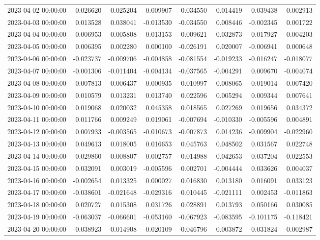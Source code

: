 \begin{tabular}{lrrrrrrr}
2023-04-02 00:00:00 & -0.026620 & -0.025204 & -0.009907 & -0.034550 & -0.014419 & -0.039438 & 0.002913 \\
2023-04-03 00:00:00 & 0.013528 & 0.038041 & -0.013530 & -0.034550 & 0.008446 & -0.002345 & 0.001722 \\
2023-04-04 00:00:00 & 0.006953 & -0.005808 & 0.013153 & -0.009621 & 0.032873 & 0.017927 & -0.004203 \\
2023-04-05 00:00:00 & 0.006395 & 0.002280 & 0.000100 & -0.026191 & 0.020007 & -0.006941 & 0.000648 \\
2023-04-06 00:00:00 & -0.023737 & -0.009706 & -0.004858 & -0.081554 & -0.019233 & -0.016247 & -0.018077 \\
2023-04-07 00:00:00 & -0.001306 & -0.011404 & -0.004134 & -0.037565 & -0.004291 & 0.009670 & -0.004074 \\
2023-04-08 00:00:00 & 0.007813 & -0.006437 & 0.000935 & -0.010997 & -0.008065 & -0.019014 & -0.007420 \\
2023-04-09 00:00:00 & 0.010579 & 0.013231 & 0.013740 & 0.022596 & 0.005294 & 0.009344 & 0.007641 \\
2023-04-10 00:00:00 & 0.019068 & 0.020032 & 0.045358 & 0.018565 & 0.027269 & 0.019656 & 0.034372 \\
2023-04-11 00:00:00 & 0.011766 & 0.009249 & 0.019061 & -0.007694 & -0.010330 & -0.005596 & 0.004891 \\
2023-04-12 00:00:00 & 0.007933 & -0.003565 & -0.010673 & -0.007873 & 0.014236 & -0.009904 & -0.022960 \\
2023-04-13 00:00:00 & 0.049613 & 0.018005 & 0.016653 & 0.045763 & 0.048502 & 0.031567 & 0.022748 \\
2023-04-14 00:00:00 & 0.029860 & 0.008807 & 0.002757 & 0.014988 & 0.042653 & 0.037204 & 0.022553 \\
2023-04-15 00:00:00 & 0.032091 & 0.003019 & -0.005596 & 0.002701 & -0.004444 & 0.033626 & 0.004037 \\
2023-04-16 00:00:00 & -0.002654 & 0.013325 & 0.000027 & 0.016830 & 0.013180 & 0.016091 & 0.033123 \\
2023-04-17 00:00:00 & -0.038601 & -0.021648 & -0.029316 & 0.010445 & -0.021111 & 0.002453 & -0.011863 \\
2023-04-18 00:00:00 & 0.020727 & 0.015308 & 0.031726 & 0.028891 & 0.013793 & 0.050166 & 0.030085 \\
2023-04-19 00:00:00 & -0.063037 & -0.066601 & -0.053160 & -0.067923 & -0.083595 & -0.101175 & -0.118421 \\
2023-04-20 00:00:00 & -0.038923 & -0.014908 & -0.020109 & -0.046796 & 0.003872 & -0.031824 & -0.002987 \\

\end{tabular}
